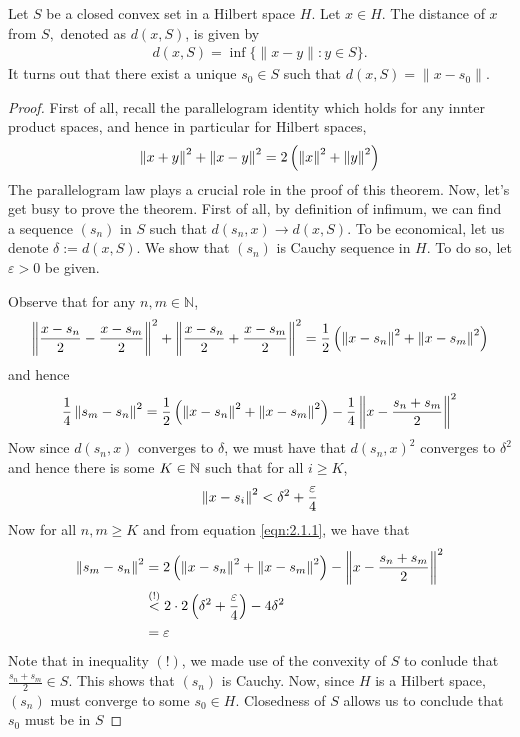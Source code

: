 \begin{theorem}
Let $S$ be a closed convex set in a Hilbert space $H.$ Let $x\in H.$ The distance of $x$ from $S,$ denoted as $d(x,S)$, is given by
\begin{align*}
d(x,S)= \inf\{ \|x-y\|: y\in S\}.
\end{align*} 
It turns out that there exist a unique $s_0\in S$ such that $d(x,S)= \|x-s_0\|.$
    \label{thm:closed-and-convex}
\end{theorem}
\begin{proof}
    First of all, recall the parallelogram identity which holds for any innter product spaces, and hence in particular for Hilbert spaces,
    \begin{equation*}
	\left\lVert x+y \right\rVert^{2} + \left\lVert x-y \right\rVert^{2} = 2 \left( \left\lVert x \right\rVert^{2} + \left\lVert y \right\rVert^{2} \right)
    \end{equation*}
    The parallelogram law plays a crucial role in the proof of this theorem.
    Now, let's get busy to prove the theorem.
    First of all, by definition of infimum, we can find a sequence $\left( s_{n} \right)$ in $S$ such that $d (s_{n}, x) \to d \left( x,S \right)$. To be economical, let us denote $\delta := d \left( x,S \right)$. We show that $\left( s_n \right)$ is Cauchy sequence in $H$. To do so, let $\varepsilon >0$ be given.

    Observe that for any $n,m \in \mathbb N$,
    \begin{align*}
	\left\lVert \frac{x-s_{n}}{2} - \frac{x-s_m}{2} \right\rVert^{2} + \left\lVert \frac{x-s_{n}}{2} + \frac{x-s_m}{2} \right\rVert^{2} = \frac{1}{2} \left( \left\lVert x-s_{n} \right\rVert^{2} + \left\lVert x-s_m \right\rVert^{2} \right)
    \end{align*}
     and hence
     \begin{align}
	 \frac{1}{4} \left\lVert s_m - s_n \right\rVert^{2} = \frac{1}{2} \left( \left\lVert x-s_{n} \right\rVert^{2} + \left\lVert x-s_m \right\rVert^{2} \right) - \frac{1}{4} \left\lVert x - \frac{s_n + s_m}{2} \right\rVert^{2}
	 \label{eqn:2.1.1}
     \end{align}
     Now since $d\left( s_n ,x \right)$ converges to $\delta$, we must have that $d \left( s_{n} , x \right)^{2}$ converges to $\delta ^{2}$ and hence there is some $K\in \mathbb N$ such that for all $i\ge K$, 
     \begin{equation*}
	 \left\lVert x-s_{i} \right\rVert^{2} < \delta^{2} + \frac{\varepsilon}{4} 
     \end{equation*}
     Now for all $n,m \ge K$ and from equation \ref{eqn:2.1.1}, we have that 
\begin{align*}
    \left\lVert s_m - s_n \right\rVert^{2} &= 2 \left( \left\lVert x-s_{n} \right\rVert^{2} + \left\lVert x-s_m \right\rVert^{2} \right) - \left\lVert x - \frac{s_n + s_m}{2} \right\rVert^{2} \\
	 &\stackrel{(!)}{<} 2 \cdot 2\left( \delta ^{2} + \frac{\varepsilon}{4} \right)-  4 \delta ^{2} \\
	 &= \varepsilon
     \end{align*}
     Note that in inequality $(!)$, we made use of the convexity of $S$ to conlude that $\frac{s_n + s_m}{2} \in S$. 
     This shows that $\left( s_{n} \right)$ is Cauchy. Now, since $H$ is a Hilbert space, $\left( s_{n} \right)$ must converge to some $s_{0} \in H$. Closedness of $S$ allows us to conclude that $s_0$ must be in $S$


\end{proof}
